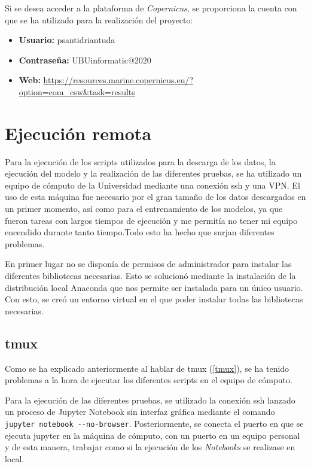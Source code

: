 Si se desea acceder a la plataforma de \emph{Copernicus}, se proporciona la cuenta con que se ha utilizado para la realización del proyecto:
\begin{itemize}
	\item \textbf{Usuario:} psantidriantuda
	\item \textbf{Contraseña:} UBUinformatic@2020
	\item \textbf{Web:} \href{https://resources.marine.copernicus.eu/?option=com_csw&task=results}{https://resources.marine.copernicus.eu/?option=com\_csw\&task=results}
\end{itemize}


\section{Ejecución remota}
Para la ejecución de los scripts utilizados para la descarga de los datos, la ejecución del modelo y la realización de las diferentes pruebas, se ha utilizado un equipo de cómputo de la Universidad mediante una conexión ssh y una VPN. El uso de esta máquina fue necesario por el gran tamaño de los datos descargados en un primer momento, así como para el entrenamiento de los modelos, ya que fueron tareas con largos tiempos de ejecución y me permitía no tener mi equipo encendido durante tanto tiempo.Todo esto ha hecho que surjan diferentes problemas.

En primer lugar no se disponía de permisos de administrador para instalar las diferentes bibliotecas necesarias. Esto se solucionó mediante la instalación de la distribución local Anaconda que nos permite ser instalada para un único usuario. Con esto, se creó un entorno virtual en el que poder instalar todas las bibliotecas necesarias.

\subsection{tmux}
Como se ha explicado anteriormente al hablar de tmux (\ref{tmux}), se ha tenido problemas a la hora de ejecutar los diferentes scripts en el equipo de cómputo.

Para la ejecución de las diferentes pruebas, se utilizado la conexión ssh lanzado un proceso de Jupyter Notebook sin interfaz gráfica mediante el comando \verb|jupyter notebook --no-browser|. Posteriormente, se conecta el puerto en que se ejecuta jupyter en la máquina de cómputo, con un puerto en un equipo personal y de esta manera, trabajar como si la ejecución de los \emph{Notebooks} se realizase en local.

